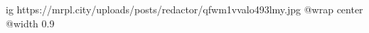 
 
 
 
 

\ifcmt
  ig https://mrpl.city/uploads/posts/redactor/qfwm1vvalo493lmy.jpg
  @wrap center
  @width 0.9
\fi
